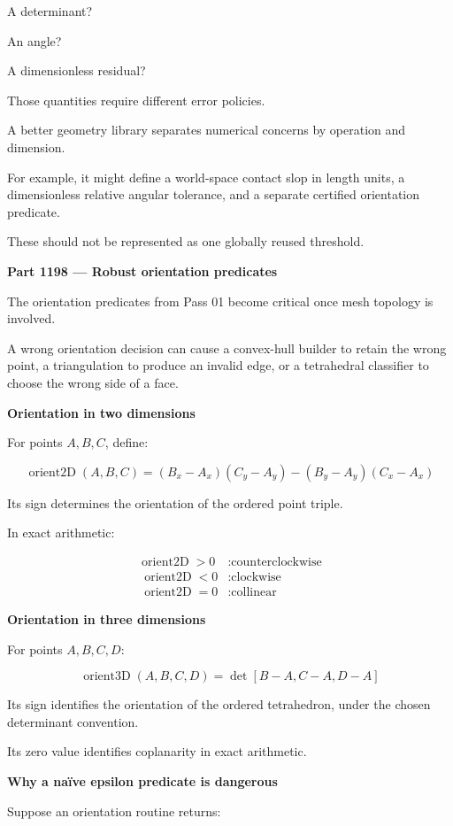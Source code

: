 A determinant?

An angle?

A dimensionless residual?

Those quantities require different error policies.

A better geometry library separates numerical concerns by operation and dimension.

For example, it might define a world-space contact slop in length units, a dimensionless relative angular tolerance, and a separate certified orientation predicate.

These should not be represented as one globally reused threshold.

\textbf{Part 1198 --- Robust orientation predicates}

The orientation predicates from Pass 01 become critical once mesh topology is involved.

A wrong orientation decision can cause a convex-hull builder to retain the wrong point, a triangulation to produce an invalid edge, or a tetrahedral classifier to choose the wrong side of a face.

\textbf{Orientation in two dimensions}

For points \(A,B,C\), define:

\[
\boxed{ \operatorname{orient2D}(A,B,C)= (B_x-A_x)(C_y-A_y) - (B_y-A_y)(C_x-A_x) }
\]

Its sign determines the orientation of the ordered point triple.

In exact arithmetic:

\[
\begin{aligned} \operatorname{orient2D}>0 &: \text{counterclockwise}\\\ \operatorname{orient2D}<0 &: \text{clockwise}\\\ \operatorname{orient2D}=0 &: \text{collinear} \end{aligned}
\]

\textbf{Orientation in three dimensions}

For points \(A,B,C,D\):

\[
\boxed{ \operatorname{orient3D}(A,B,C,D)= \det[B-A,C-A,D-A] }
\]

Its sign identifies the orientation of the ordered tetrahedron, under the chosen determinant convention.

Its zero value identifies coplanarity in exact arithmetic.

\textbf{Why a naïve epsilon predicate is dangerous}

Suppose an orientation routine returns:

